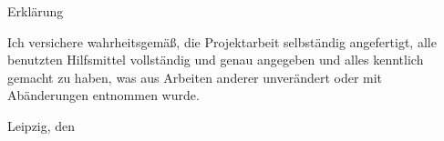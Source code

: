 \thispagestyle{empty}
\begin{center}
\large \lsstyle Erklärung
\end{center}
\vspace{1.5cm}
{\doublespacing
Ich versichere wahrheitsgemäß, die Projektarbeit selbständig angefertigt, alle benutzten Hilfsmittel vollständig und genau angegeben und alles kenntlich gemacht zu haben, was aus Arbeiten anderer unverändert oder mit Abänderungen entnommen wurde.}\par
\vspace{2cm}
\noindent
\begin{minipage}[t]{6.5cm}
\dotfill

\onehalfspacing
\autor

Leipzig, den \datum
\end{minipage}\par
\vspace{2.5cm}

\iffalse %
\begin{minipage}[t]{6.5cm}
\dotfill

\onehalfspacing
\autorII

Leipzig, den \datum
\end{minipage}\par
\vspace{2.5cm}

\fi %

\iffalse %

\begin{minipage}[t]{6.5cm}
\dotfill

\onehalfspacing
\autorIII

Leipzig, den \datum
\end{minipage}\par

\fi  %

\clearpage
